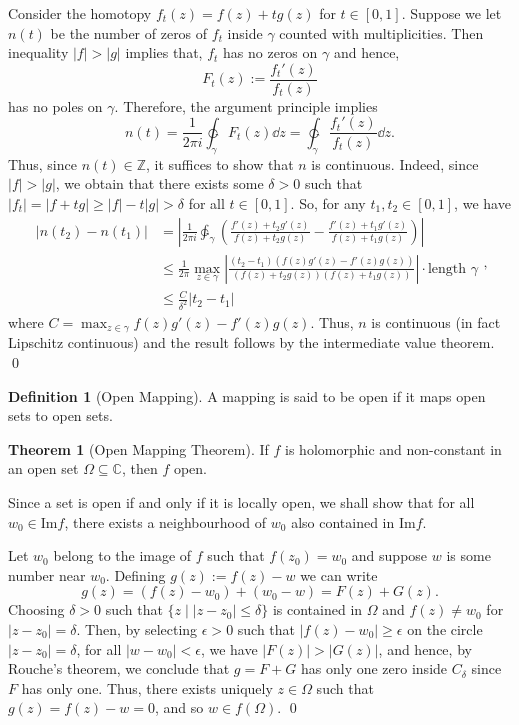 \documentclass[
]{article}
\theoremstyle{definition}
\newtheorem{theorem}{Theorem}
\theoremstyle{definition}
\newtheorem{definition}{Definition}[section]
\begin{document}
Consider the homotopy \(f_t(z) = f(z) + tg(z)\) for \(t \in [0, 1]\).
Suppose we let \(n(t)\) be the number of zeros of \(f_t\) inside
\(\gamma\) counted with multiplicities. Then inequality \(|f| > |g|\)
implies that, \(f_t\) has no zeros on \(\gamma\) and hence,
\[F_t(z) := \frac{f_t'(z)}{f_t(z)}\] has no poles on \(\gamma\).
Therefore, the argument principle implies
\[n(t) = \frac{1}{2\pi i}\ointctrclockwise_\gamma F_t(z) \dd z = 
    \ointctrclockwise_\gamma \frac{f_t'(z)}{f_t(z)} \dd z.\] Thus, since
\(n(t) \in \mathbb{Z}\), it suffices to show that \(n\) is continuous.
Indeed, since \(|f| > |g|\), we obtain that there exists some
\(\delta > 0\) such that \(|f_t| = |f + tg| \ge |f| - t|g| > \delta\)
for all \(t \in [0, 1]\). So, for any \(t_1, t_2 \in [0, 1]\), we have
\[\begin{split}
    |n(t_2) - n(t_1)| 
      & = \left| \frac{1}{2\pi i} \ointctrclockwise_\gamma \left(
            \frac{f'(z) + t_2 g'(z)}{f(z) + t_2 g(z)} - 
            \frac{f'(z) + t_1 g'(z)}{f(z) + t_1 g(z)}
          \right) \right|\\
      & \le \frac{1}{2\pi} \max_{z \in \gamma} \left| 
        \frac{(t_2 - t_1)(f(z)g'(z) - f'(z)g(z))}{(f(z) + t_2 g(z))(f(z) + t_1 g(z))}
        \right| \cdot \text{length } \gamma\\
      & \le \frac{C}{\delta^2}|t_2 - t_1|
  \end{split},\] where
\(C = \max_{z \in \gamma} f(z)g'(z) - f'(z)g(z)\). Thus, \(n\) is
continuous (in fact Lipschitz continuous) and the result follows by the
intermediate value theorem. \qed

\begin{definition}[Open Mapping]
  A mapping is said to be open if it maps open sets to open sets.
\end{definition}

\begin{theorem}[Open Mapping Theorem]
  If \(f\) is holomorphic and non-constant in an open set \(\Omega \subseteq \mathbb{C}\), 
  then \(f\) open.
\end{theorem}
\proof

Since a set is open if and only if it is locally open, we shall show
that for all \(w_0 \in \text{Im}f\), there exists a neighbourhood of
\(w_0\) also contained in \(\text{Im}f\).

Let \(w_0\) belong to the image of \(f\) such that \(f(z_0) = w_0\) and
suppose \(w\) is some number near \(w_0\). Defining \(g(z) := f(z) - w\)
we can write \[g(z) = (f(z) - w_0) + (w_0 - w) = F(z) + G(z).\] Choosing
\(\delta > 0\) such that \(\{z \mid | z - z_0 | \le \delta\}\) is
contained in \(\Omega\) and \(f(z) \neq w_0\) for
\(|z - z_0| = \delta\). Then, by selecting \(\epsilon > 0\) such that
\(|f(z) - w_0| \ge \epsilon\) on the circle \(|z - z_0| = \delta\), for
all \(|w - w_0| < \epsilon\), we have \(|F(z)| > |G(z)|\), and hence, by
Rouche's theorem, we conclude that \(g = F + G\) has only one zero
inside \(C_\delta\) since \(F\) has only one. Thus, there exists
uniquely \(z \in \Omega\) such that \(g(z) = f(z) - w = 0\), and so
\(w \in f(\Omega)\). \qed
\end{document}
